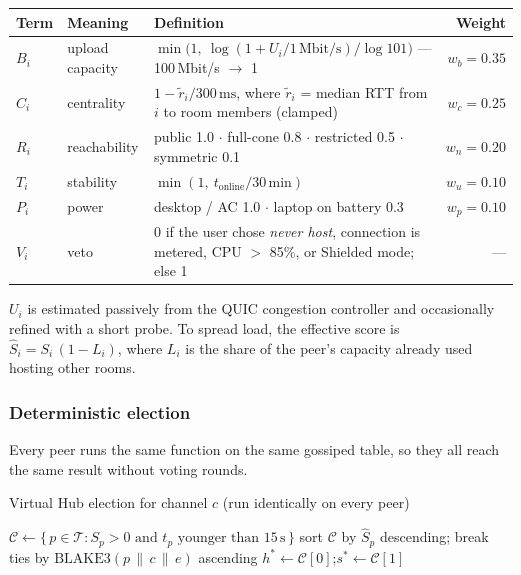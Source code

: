 \documentclass[11pt,a4paper]{article}
\begin{document}
\begin{center}
\small
\begin{tabularx}{\linewidth}{@{}l l Y r@{}}
\toprule
\textbf{Term} & \textbf{Meaning} & \textbf{Definition} & \textbf{Weight} \\
\midrule
$B_i$ & upload capacity & $\min\!\big(1,\ \log(1 + U_i/1\,\text{Mbit/s}) / \log 101\big)$ --- 100\,Mbit/s $\to$ 1 & $w_b = 0.35$ \\
$C_i$ & centrality & $1 - \tilde{r}_i / 300\,\text{ms}$, where $\tilde{r}_i$ = median RTT from $i$ to room members (clamped) & $w_c = 0.25$ \\
$R_i$ & reachability & public 1.0 $\cdot$ full-cone 0.8 $\cdot$ restricted 0.5 $\cdot$ symmetric 0.1 & $w_n = 0.20$ \\
$T_i$ & stability & $\min(1,\ t_{\text{online}} / 30\,\text{min})$ & $w_u = 0.10$ \\
$P_i$ & power & desktop / AC 1.0 $\cdot$ laptop on battery 0.3 & $w_p = 0.10$ \\
$V_i$ & veto & 0 if the user chose \emph{never host}, connection is metered, CPU $>$ 85\%, or Shielded mode; else 1 & --- \\
\bottomrule
\end{tabularx}
\end{center}

$U_i$ is estimated passively from the QUIC congestion controller and occasionally refined
with a short probe. To spread load, the effective score is $\hat{S}_i = S_i\,(1 - L_i)$,
where $L_i$ is the share of the peer's capacity already used hosting other rooms.

\subsubsection{Deterministic election}
Every peer runs the same function on the same gossiped table, so they all reach the same
result without voting rounds.

\begin{algorithm}[ht]
\caption{Virtual Hub election for channel $c$ (run identically on every peer)}
\label{alg:elect}
$\mathcal{C} \gets \{\,p \in \mathcal{T} : S_p > 0 \text{ and } t_p \text{ younger than } 15\,\text{s}\,\}$\;
sort $\mathcal{C}$ by $\hat{S}_p$ descending; break ties by $\mathrm{BLAKE3}(p \,\|\, c \,\|\, e)$ ascending\;
$h^\ast \gets \mathcal{C}[0]$;\quad $s^\ast \gets \mathcal{C}[1]$\;
\end{algorithm}
\end{document}
